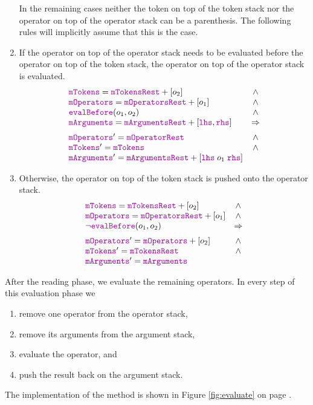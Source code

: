 \begin{enumerate}
      In the remaining cases neither the token on top of the token stack nor the operator on top of the
      operator stack can be a parenthesis.  The following rules will implicitly assume that this is the case.
\item If the operator on top of the operator stack needs to be evaluated before the operator on top of the token stack,
      the operator on top of the operator stack is evaluated.
    $$\begin{array}{lc}
        \mytt{mTokens} = \mytt{mTokensRest} + [o_2]                                        & \wedge \\
        \mytt{mOperators} = \mytt{mOperatorsRest} + [o_1]                                  & \wedge \\
        \mytt{evalBefore}(o_1, o_2)                                                          & \wedge \\ 
        \mytt{mArguments} = \mytt{mArgumentsRest} + [\mytt{lhs}, \mytt{rhs}]           & \Rightarrow \\[0.2cm]
        \mytt{mOperators}' = \mytt{mOperatorRest}                                          & \wedge \\
        \mytt{mTokens}' = \mytt{mTokens}                                                   & \wedge \\
        \mytt{mArguments}' = \mytt{mArgumentsRest} + [\mytt{lhs} \;o_1\; \mytt{rhs}]
        \end{array} 
      $$
\item Otherwise, the operator on top of the token stack is pushed onto the operator stack.
     $$\begin{array}{lc}
         \mytt{mTokens} = \mytt{mTokensRest} + [o_2]           & \wedge \\
         \mytt{mOperators} = \mytt{mOperatorsRest} + [o_1]     & \wedge \\
         \neg \mytt{evalBefore}(o_1, o_2)                        & \Rightarrow \\[0.2cm]
        \mytt{mOperators}' = \mytt{mOperators} + [o_2]         & \wedge \\
        \mytt{mTokens}' = \mytt{mTokensRest}                   & \wedge \\
        \mytt{mArguments}' = \mytt{mArguments}
        \end{array} 
      $$
\end{enumerate}
After the reading phase, we evaluate the remaining operators.  In every step of this evaluation phase we   
\begin{enumerate}
\item remove one operator from the operator stack, 
\item remove its arguments from the argument stack, 
\item evaluate the operator, and 
\item push the result back on the argument stack. 
\end{enumerate}
The implementation of the method  is shown in Figure \ref{fig:evaluate} on page \pageref{fig:evaluate}.

